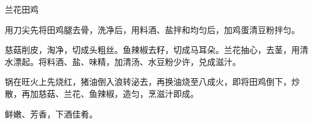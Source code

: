 \begin{recipe}{兰花田鸡}

\ingredients


\preparation

\step 用刀尖先将田鸡腿去骨，洗净后，用料酒、盐拌和均匀后，加鸡蛋清豆粉拌匀。

\step 慈菇削皮，淘净，切成头粗丝。鱼辣椒去籽，切成马耳朵。兰花抽心，去茎，用清
水漂起。将料酒、盐、味精，加清汤、水豆粉少许，兑成滋汁。

\step 锅在旺火上先烧红，猪油倒入浪转泌去，再换油烧至八成火，即将田鸡倒下，炒
散，再加慈菇、兰花、鱼辣椒，造匀，烹滋汁即成。

\features

鲜嫩、芳香，下酒佳肴。

\end{recipe}


